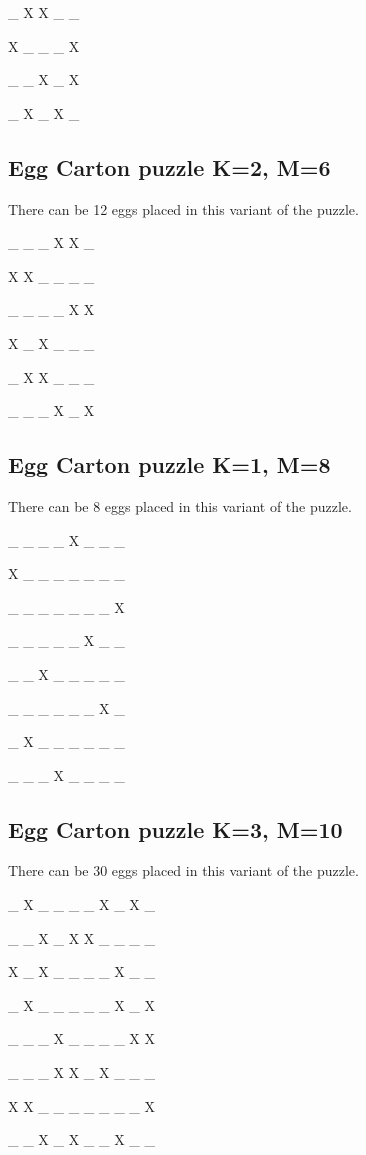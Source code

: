 \documentclass{article}
\begin{document}
\_ X X \_ \_ 

X \_ \_ \_ X 

\_ \_ X \_ X 

\_ X \_ X \_ 


\subsection{Egg Carton puzzle K=2, M=6}

There can be 12 eggs placed in this variant of the puzzle.

\_ \_ \_ X X \_ 

X X \_ \_ \_ \_ 

\_ \_ \_ \_ X X 

X \_ X \_ \_ \_ 

\_ X X \_ \_ \_ 

\_ \_ \_ X \_ X 


\subsection{Egg Carton puzzle K=1, M=8}

There can be 8 eggs placed in this variant of the puzzle.

\_ \_ \_ \_ X \_ \_ \_ 

X \_ \_ \_ \_ \_ \_ \_ 

\_ \_ \_ \_ \_ \_ \_ X 

\_ \_ \_ \_ \_ X \_ \_ 

\_ \_ X \_ \_ \_ \_ \_ 

\_ \_ \_ \_ \_ \_ X \_ 

\_ X \_ \_ \_ \_ \_ \_ 

\_ \_ \_ X \_ \_ \_ \_ 


\subsection{Egg Carton puzzle K=3, M=10}

There can be 30 eggs placed in this variant of the puzzle. 

\_ X \_ \_ \_ \_ X \_ X \_ 

\_ \_ X \_ X X \_ \_ \_ \_ 

X \_ X \_ \_ \_ \_ X \_ \_ 

\_ X \_ \_ \_ \_ \_ X \_ X 

\_ \_ \_ X \_ \_ \_ \_ X X 

\_ \_ \_ X X \_ X \_ \_ \_ 

X X \_ \_ \_ \_ \_ \_ \_ X 

\_ \_ X \_ X \_ \_ X \_ \_ 
\end{document}
